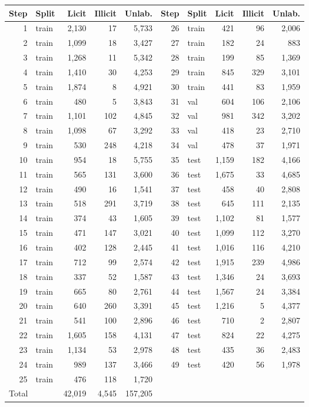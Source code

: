 \begin{tabular}{rlrrr|rlrrr}
\toprule
Step & Split & Licit & Illicit & Unlab. & Step & Split & Licit & Illicit & Unlab.\\
\midrule
1 & train & 2,130 & 17 & 5,733 & 26 & train & 421 & 96 & 2,006 \\
2 & train & 1,099 & 18 & 3,427 & 27 & train & 182 & 24 & 883 \\
3 & train & 1,268 & 11 & 5,342 & 28 & train & 199 & 85 & 1,369 \\
4 & train & 1,410 & 30 & 4,253 & 29 & train & 845 & 329 & 3,101 \\
5 & train & 1,874 & 8 & 4,921 & 30 & train & 441 & 83 & 1,959 \\
6 & train & 480 & 5 & 3,843 & 31 & val & 604 & 106 & 2,106 \\
7 & train & 1,101 & 102 & 4,845 & 32 & val & 981 & 342 & 3,202 \\
8 & train & 1,098 & 67 & 3,292 & 33 & val & 418 & 23 & 2,710 \\
9 & train & 530 & 248 & 4,218 & 34 & val & 478 & 37 & 1,971 \\
10 & train & 954 & 18 & 5,755 & 35 & test & 1,159 & 182 & 4,166 \\
11 & train & 565 & 131 & 3,600 & 36 & test & 1,675 & 33 & 4,685 \\
12 & train & 490 & 16 & 1,541 & 37 & test & 458 & 40 & 2,808 \\
13 & train & 518 & 291 & 3,719 & 38 & test & 645 & 111 & 2,135 \\
14 & train & 374 & 43 & 1,605 & 39 & test & 1,102 & 81 & 1,577 \\
15 & train & 471 & 147 & 3,021 & 40 & test & 1,099 & 112 & 3,270 \\
16 & train & 402 & 128 & 2,445 & 41 & test & 1,016 & 116 & 4,210 \\
17 & train & 712 & 99 & 2,574 & 42 & test & 1,915 & 239 & 4,986 \\
18 & train & 337 & 52 & 1,587 & 43 & test & 1,346 & 24 & 3,693 \\
19 & train & 665 & 80 & 2,761 & 44 & test & 1,567 & 24 & 3,384 \\
20 & train & 640 & 260 & 3,391 & 45 & test & 1,216 & 5 & 4,377 \\
21 & train & 541 & 100 & 2,896 & 46 & test & 710 & 2 & 2,807 \\
22 & train & 1,605 & 158 & 4,131 & 47 & test & 824 & 22 & 4,275 \\
23 & train & 1,134 & 53 & 2,978 & 48 & test & 435 & 36 & 2,483 \\
24 & train & 989 & 137 & 3,466 & 49 & test & 420 & 56 & 1,978 \\
25 & train & 476 & 118 & 1,720 & & & & & \\
\midrule
\multicolumn{2}{l}{Total} & 42,019 & 4,545 & 157,205 & \multicolumn{5}{l}{}\\
\bottomrule
\end{tabular}
